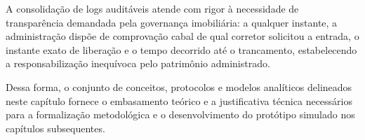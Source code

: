 A consolidação de logs auditáveis atende com rigor à necessidade de transparência demandada pela governança imobiliária: a qualquer instante, a administração dispõe de comprovação cabal de qual corretor solicitou a entrada, o instante exato de liberação e o tempo decorrido até o trancamento, estabelecendo a responsabilização inequívoca pelo patrimônio administrado.

\bigskip
Dessa forma, o conjunto de conceitos, protocolos e modelos analíticos delineados neste capítulo fornece o embasamento teórico e a justificativa técnica necessários para a formalização metodológica e o desenvolvimento do protótipo simulado nos capítulos subsequentes.